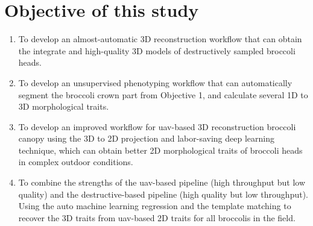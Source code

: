 











\section{Objective of this study}

\begin{enumerate}
    \item To develop an almost-automatic 3D reconstruction workflow that can obtain the integrate and high-quality 3D models of destructively sampled broccoli heads.
    \item To develop an unsupervised phenotyping workflow that can automatically segment the broccoli crown part from Objective 1, and calculate several 1D to 3D morphological traits.
    \item To develop an improved workflow for \gls{uav}-based 3D reconstruction broccoli canopy using the 3D to 2D projection and labor-saving deep learning technique, which can obtain better 2D morphological traits of broccoli heads in complex outdoor conditions.
    \item To combine the strengths of the \gls{uav}-based pipeline (high throughput but low quality) and the destructive-based pipeline (high quality but low throughput). Using the auto machine learning regression and the template matching to recover the 3D traits from \gls{uav}-based 2D traits for all broccolis in the field.

\end{enumerate}


